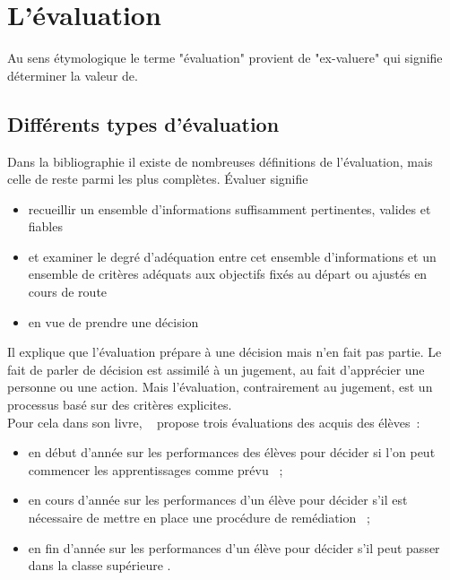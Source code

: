 \section{L'évaluation}

Au sens étymologique le terme "évaluation" provient de "ex-valuere" qui signifie déterminer la valeur de.

\subsection{Différents types d'évaluation}

Dans la bibliographie il existe de nombreuses définitions de l'évaluation, mais celle de \cite{de_ketele_levaluation_1989} reste parmi les plus complètes.
\og Évaluer signifie
\begin{itemize} 
\item recueillir un ensemble d'informations suffisamment pertinentes, valides et fiables
\item et examiner le degré d'adéquation entre cet ensemble d'informations et un ensemble de critères adéquats aux objectifs fixés au départ ou ajustés en cours de route
\item en vue de prendre une décision \fg
\end{itemize}


Il explique que l'évaluation prépare à une décision mais n'en fait pas partie. 
Le fait de parler de décision est assimilé à un jugement, au fait d'apprécier une personne ou une action. 
Mais l'évaluation, contrairement au jugement, est un processus basé sur des critères explicites.\\

Pour cela dans son livre, ~\cite{roegiers_lecole_2010} propose trois évaluations des acquis des élèves~:
\begin{itemize}
\item \og en début d'année sur les performances des élèves pour décider si l'on peut commencer les apprentissages comme prévu \fg ~;
\item \og en cours d'année sur les performances d'un élève pour décider s'il est nécessaire de mettre en place une procédure de remédiation \fg ~;
\item \og en fin d'année sur les performances d'un élève pour décider s'il peut passer dans la classe supérieure \fg .\\
\end{itemize}

